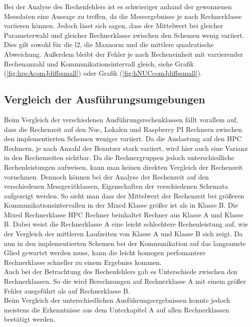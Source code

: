 Bei der Analyse des Rechenfehlers ist es schwieriger anhand der gewonnenen Messdaten eine Aussage zu treffen, da die Messergebnisse je nach Rechnerklasse variieren k\"onnen.  Jedoch l\"asst sich sagen, dass der Mittelwert bei gleicher Parameterwahl und gleicher Rechnerklasse zwischen den Schemen wenig variiert. Dies gilt sowohl f\"ur die l2, die Maxnorm und die mittlere quadratische Abweichung. Au\ss{}erdem bleibt der Fehler je nach Recheneinheit mit varrierender Rechenanzahl und Kommunikationsintervall gleich, siehe Grafik (\ref{fig:hpcAcomJdiffssmall}) oder Grafik (\ref{fig:hNUCcomJdiffssmall}).\\

\subsection{Vergleich der Ausführungsumgebungen}
Beim Vergleich der verschiedenen Ausf\"uhrungsrechenklassen f\"allt vorallem auf, dass die Rechenzeit auf den Nuc, Lokalen und Raspberry PI Rechnern zwischen den implementierten Schemen weniger variiert. Da die Auslastung auf den HPC Rechnern, je nach Anzahl der Benutzer stark variiert, wird hier auch eine Varianz in den Rechenzeiten sichtbar. Da die Rechnergruppen jedoch unterschiedliche Rechenleistungen aufweisen, kann man keinen direkten Vergleich der Rechenzeit vornehmen. Dennoch k\"onnen bei der Analyse der Rechenzeit auf den verschiedenen Messger\"atklassen, Eigenschaften der verschiedenen Schemata aufgezeigt werden. So sieht man dass der Mittelwert der Rechenzeit bei gr\"o\ss{}eren Kommunikationsintervallen in der Mixed Klasse gr\"o\ss{}er ist als in Klasse B. Die Mixed Rechnerklasse HPC Rechner beinhaltet Rechner aus Klasse A und Klasse B. Dabei weist die Rechnerklasse A eine leicht schlechtere Rechenleistung auf, wie der Vergleich der mittleren Laufzeiten von Klasse A und Klasse B sich zeigt. Da nun in den implementierten Schemen bei der Kommunikation auf das langsamste Glied gewartet werden muss, kann die leicht homogen perfomantere Rechnerklasse schneller zu einem Ergebniss kommen.\\
Auch bei der Betrachtung des Rechenfehlers gab es Unterschiede zwischen den Rechnerklassen. So die wird Berechnungen auf Rechnerklasse A mit einem gr\"o\ss{}er Fehler ausgef\"uhrt als auf Rechnerklasse B. \\
Beim Vergleich der unterschiedlichen Ausf\"uhrungsergebnissen konnte jedoch meistens die Erkenntnisse aus dem Unterkapitel A auf allen Rechnerklassen best\"atigt werden. 


